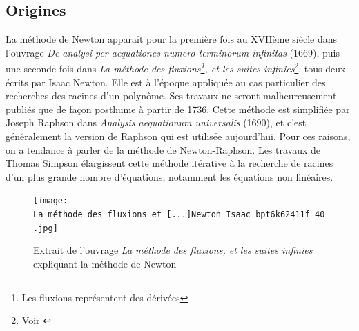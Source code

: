 \documentclass[3p, twocolumn]{elsarticle}
\begin{document}
\subsection{Origines}
La méthode de Newton apparaît pour la première fois au XVIIème siècle dans l'ouvrage \emph{De analysi per aequationes numero terminorum infinitas} (1669), puis une seconde fois dans \textit{La méthode des fluxions\footnote{Les fluxions représentent des dérivées}, et les suites infinies}\footnote{Voir \cite{book:newtonfluxions}}, tous deux écrits par Isaac Newton. Elle est à l'époque appliquée au cas particulier des recherches des racines d'un polynôme. Ses travaux ne seront malheureusement publiés que de façon posthume à partir de 1736. Cette méthode est simplifiée par Joseph Raphson dans \textit{Analysis aequationum universalis} (1690), et c'est généralement la version de Raphson qui est utilisée aujourd'hui. Pour ces raisons, on a tendance à parler de la méthode de Newton-Raphson. Les travaux de Thomas Simpson élargissent cette méthode itérative à la recherche de racines d'un plus grande nombre d'équations, notamment les équations non linéaires.
\begin{figure}[htbp]
    \centering
    \texttt{[image: La\_méthode\_des\_fluxions\_et\_[...]Newton\_Isaac\_bpt6k62411f\_40.jpg]}
    \caption{Extrait de l'ouvrage \textit{La méthode
            des fluxions, et les suites infinies} expliquant la méthode de Newton}
    \label{fig:fluxion_newton_method}
\end{figure}
\end{document}
